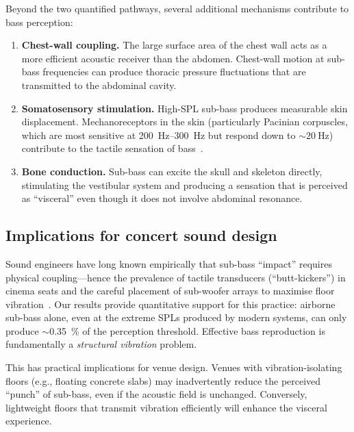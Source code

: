 Beyond the two quantified pathways, several additional mechanisms
contribute to bass perception:
%
\begin{enumerate}
  \item \textbf{Chest-wall coupling.}  The large surface area of the
    chest wall acts as a more efficient acoustic receiver than the
    abdomen.  Chest-wall motion at sub-bass frequencies can produce
    thoracic pressure fluctuations that are transmitted to the
    abdominal cavity.

  \item \textbf{Somatosensory stimulation.}  High-SPL sub-bass produces
    measurable skin displacement.  Mechanoreceptors in the skin
    (particularly Pacinian corpuscles, which are most sensitive at
    \SIrange{200}{300}{\hertz} but respond down to
    ${\sim}\SI{20}{\hertz}$) contribute to the tactile sensation of
    bass~\cite{Todd2000}.

  \item \textbf{Bone conduction.}  Sub-bass can excite the skull and
    skeleton directly, stimulating the vestibular system and producing
    a sensation that is perceived as ``visceral'' even though it does
    not involve abdominal resonance.
\end{enumerate}

\subsection{Implications for concert sound design}
\label{sec:concert-design}

Sound engineers have long known empirically that sub-bass ``impact''
requires physical coupling---hence the prevalence of tactile
transducers (``butt-kickers'') in cinema seats and the careful
placement of sub-woofer arrays to maximise floor
vibration~\cite{Leventhall2007}.  Our results provide quantitative
support for this practice: airborne sub-bass alone, even at the
extreme SPLs produced by modern systems, can only produce
$\sim$\SI{0.35}{\percent} of the perception threshold.  Effective
bass reproduction is fundamentally a \emph{structural vibration}
problem.

This has practical implications for venue design.  Venues with
vibration-isolating floors (e.g., floating concrete slabs) may
inadvertently reduce the perceived ``punch'' of sub-bass, even if the
acoustic field is unchanged.  Conversely, lightweight floors that
transmit vibration efficiently will enhance the visceral experience.

